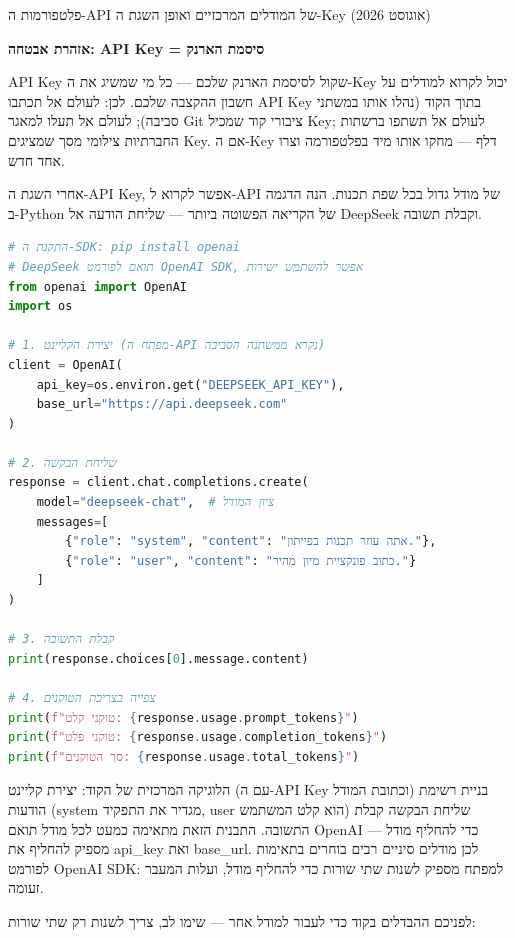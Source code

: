 \begin{center}\small\color{gray}פלטפורמות ה-API של המודלים המרכזיים ואופן השגת ה-Key (אוגוסט 2026)\end{center}

\textbf{אזהרת אבטחה: API Key = סיסמת הארנק}\par

API Key שקול לסיסמת הארנק שלכם — כל מי שמשיג את ה-Key יכול לקרוא למודלים על חשבון ההקצבה שלכם. לכן: לעולם אל תכתבו API Key בתוך הקוד (נהלו אותו במשתני סביבה); לעולם אל תעלו למאגר Git ציבורי קוד שמכיל Key; לעולם אל תשתפו ברשתות החברתיות צילומי מסך שמציגים Key. אם ה-Key דלף — מחקו אותו מיד בפלטפורמה וצרו אחד חדש.


אחרי השגת ה-API Key, אפשר לקרוא ל-API של מודל גדול בכל שפת תכנות. הנה הדגמה ב-Python של הקריאה הפשוטה ביותר — שליחת הודעה אל DeepSeek וקבלת תשובה.

\begin{lstlisting}[language=Python]
# התקנת ה-SDK: pip install openai
# DeepSeek תואם לפורמט OpenAI SDK, אפשר להשתמש ישירות
from openai import OpenAI
import os

# 1. יצירת הקליינט (מפתח ה-API נקרא ממשתנה הסביבה)
client = OpenAI(
    api_key=os.environ.get("DEEPSEEK_API_KEY"),
    base_url="https://api.deepseek.com"
)

# 2. שליחת הבקשה
response = client.chat.completions.create(
    model="deepseek-chat",  # ציון המודל
    messages=[
        {"role": "system", "content": "אתה עוזר תכנות בפייתון."},
        {"role": "user", "content": "כתוב פונקציית מיון מהיר."}
    ]
)

# 3. קבלת התשובה
print(response.choices[0].message.content)

# 4. צפייה בצריכת הטוקנים
print(f"טוקני קלט: {response.usage.prompt_tokens}")
print(f"טוקני פלט: {response.usage.completion_tokens}")
print(f"סך הטוקנים: {response.usage.total_tokens}")
\end{lstlisting}

הלוגיקה המרכזית של הקוד: יצירת קליינט (עם ה-API Key וכתובת המודל) בניית רשימת הודעות (system מגדיר את התפקיד, user הוא קלט המשתמש) שליחת הבקשה קבלת התשובה. התבנית הזאת מתאימה כמעט לכל מודל תואם OpenAI — כדי להחליף מודל מספיק להחליף את api\_key ואת base\_url. לכן מודלים סיניים רבים בוחרים בתאימות לפורמט OpenAI SDK: למפתח מספיק לשנות שתי שורות כדי להחליף מודל, ועלות המעבר זעומה.

לפניכם ההבדלים בקוד כדי לעבור למודל אחר — שימו לב, צריך לשנות רק שתי שורות:

